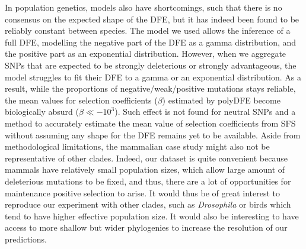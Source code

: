 \documentclass{article}
\newcommand{\Spop}{\beta}
\begin{document}

    In population genetics, models also have shortcomings, such that there is no consensus on the expected shape of the DFE\cite{welch_divergence_2008, bataillon_effects_2014}, but it has indeed been found to be reliably constant between species\cite{castellano_comparison_2019}.
    The model we used allows the inference of a full DFE, modelling the negative part of the DFE as a gamma distribution, and the positive part as an exponential distribution.
    However, when we aggregate SNPs that are expected to be strongly deleterious or strongly advantageous, the model struggles to fit their DFE to a gamma or an exponential distribution.\cite{brevet_reconstructing_2021}
    As a result, while the proportions of negative/weak/positive mutations stays reliable, the mean values for selection coefficients ($\Spop$) estimated by polyDFE become biologically absurd ($\Spop \ll -10^3$).
    Such effect is not found for neutral SNPs and a method to accurately estimate the mean value of selection coefficients from SFS without assuming any shape for the DFE remains yet to be available.
    Aside from methodological limitations, the mammalian case study might also not be representative of other clades.
    Indeed, our dataset is quite convenient because mammals have relatively small population sizes, which allow large amount of deleterious mutations to be fixed, and thus, there are a lot of opportunities for maintenance positive selection to arise.
    It would thus be of great interest to reproduce our experiment with other clades, such as \textit{Drosophila} or birds which tend to have higher effective population size.
    It would also be interesting to have access to more shallow but wider phylogenies to increase the resolution of our predictions.
\end{document}
